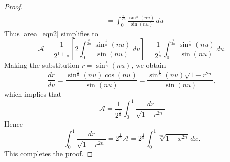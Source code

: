 \documentclass[10pt,a4paper]{amsart}
\newcommand{\calA}{\mathcal{A}}
\begin{document}
\begin{proof}
\begin{align*}
&=\int_0^{\frac{\pi}{2n}}\frac{\sin^{\frac{1}{n}}(nu)}{\sin(nu)}\,du
\end{align*}
Thus \eqref{area_eqn2} simplifies to
\begin{equation}
\calA=\frac{1}{2^{1+\frac{1}{n}}}\left[2\int_0^{\frac{\pi}{2n}}\frac{\sin^{\frac{1}{n}}(nu)}{\sin(nu)}\,du\right]=
\frac{1}{2^{\frac{1}{n}}}\int_0^{\frac{\pi}{2n}}\frac{\sin^{\frac{1}{n}}(nu)}{\sin(nu)}\,du.
\end{equation}
Making the substitution $r=\sin^{\frac{1}{n}}(nu)$, we obtain
\[\frac{dr}{du}=\frac{\sin^{\frac{1}{n}}(nu)\cos(nu)}{\sin(nu)}=\frac{\sin^{\frac{1}{n}}(nu)\sqrt{1-r^{2n}}}{\sin(nu)},\]
which implies that
\begin{equation}
\calA=\frac{1}{2^{\frac{1}{n}}}\int_0^1\frac{\,dr}{\sqrt{1-r^{2n}}}
\end{equation}
Hence
\[\int_0^1\frac{\,dr}{\sqrt{1-r^{2n}}}=2^{\frac{1}{n}}\calA=2^{\frac{1}{n}}\int_0^1 \sqrt[2n]{1-x^{2n}} \, dx.\]
This completes the proof.
\end{proof}
\end{document}
